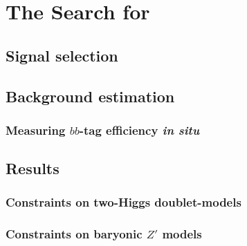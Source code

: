 \chapter{The Search for \monohiggs}

\section{Signal selection}

\section{Background estimation}

\subsection{Measuring $bb$-tag efficiency \emph{in situ}}

\section{Results}

\subsection{Constraints on two-Higgs doublet-models}

\subsection{Constraints on baryonic $Z'$ models}

